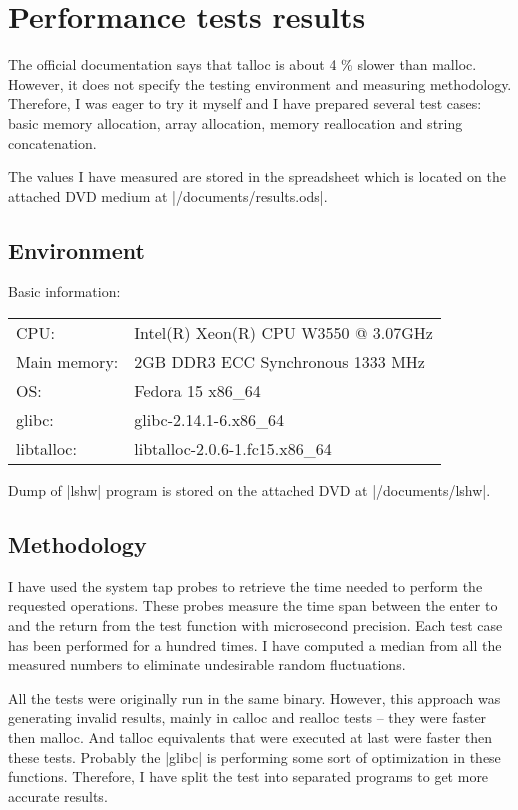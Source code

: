\chapter{Performance tests results}

The official documentation says that talloc is about 4 \% slower than
malloc\cite{TallocDoc}. However, it does not specify the testing environment and
measuring methodology. Therefore, I was eager to try it myself and I have
prepared several test cases: basic memory allocation, array allocation, memory
reallocation and string concatenation.

The values I have measured are stored in the spreadsheet which is located on the
attached DVD medium at |/documents/results.ods|. 

\section{Environment}

Basic information:

\begin{table}[h]
  \begin{tabular}{l l}
  CPU: & Intel(R) Xeon(R) CPU W3550  @ 3.07GHz \\
  Main memory: & 2GB DDR3 ECC Synchronous 1333 MHz \\
  OS: & Fedora 15 x86_64 \\
  glibc: & glibc-2.14.1-6.x86_64 \\
  libtalloc: & libtalloc-2.0.6-1.fc15.x86_64
  \end{tabular}
\end{table}

\noindent
Dump of |lshw| program is stored on the attached DVD at |/documents/lshw|.

\section{Methodology}

I have used the system tap probes to retrieve the time needed to perform the
requested operations. These probes measure the time span between the enter to
and the return from the test function with microsecond precision. Each test case
has been performed for a hundred times. I have computed a median from all the
measured numbers to eliminate undesirable random fluctuations.

All the tests were originally run in the same binary. However, this approach was
generating invalid results, mainly in calloc and realloc tests -- they were
faster then malloc. And talloc equivalents that were executed at last were
faster then these tests. Probably the |glibc| is performing some sort of
optimization in these functions. Therefore, I have split the test into
separated programs to get more accurate results.

